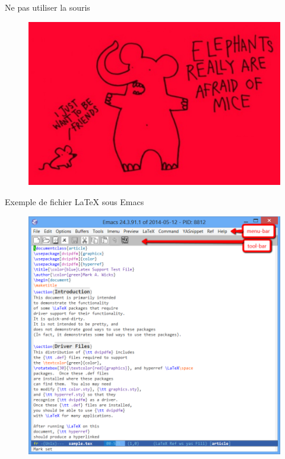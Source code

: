 \documentclass[t]{beamer}
\begin{document}
\begin{frame}[label={sec:orgf558a9a}]{Ne pas utiliser la souris}
\begin{figure}[!htbp]
\centering
\includegraphics[width=.9\linewidth]{images/elephants.png}
\end{figure}
\end{frame}

\begin{frame}[label={sec:orgfcaff63}]{Exemple de fichier \LaTeX{} sous Emacs}
\begin{figure}[!htbp]
\centering
\includegraphics[width=.65\linewidth]{images/toolbar.png}
\end{figure}
\end{frame}
\end{document}
